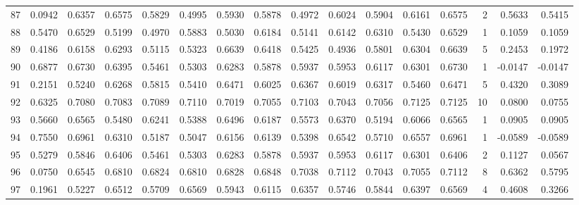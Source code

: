 \begin{tabular}{lrrrrrrrrrrrrrrr}
87  &      0.0942 &  0.6357 &  0.6575 &  0.5829 &  0.4995 &  0.5930 &  0.5878 &  0.4972 &  0.6024 &  0.5904 &   0.6161 &     0.6575 &      2 &                    0.5633 &                     0.5415 \\
88  &      0.5470 &  0.6529 &  0.5199 &  0.4970 &  0.5883 &  0.5030 &  0.6184 &  0.5141 &  0.6142 &  0.6310 &   0.5430 &     0.6529 &      1 &                    0.1059 &                     0.1059 \\
89  &      0.4186 &  0.6158 &  0.6293 &  0.5115 &  0.5323 &  0.6639 &  0.6418 &  0.5425 &  0.4936 &  0.5801 &   0.6304 &     0.6639 &      5 &                    0.2453 &                     0.1972 \\
90  &      0.6877 &  0.6730 &  0.6395 &  0.5461 &  0.5303 &  0.6283 &  0.5878 &  0.5937 &  0.5953 &  0.6117 &   0.6301 &     0.6730 &      1 &                   -0.0147 &                    -0.0147 \\
91  &      0.2151 &  0.5240 &  0.6268 &  0.5815 &  0.5410 &  0.6471 &  0.6025 &  0.6367 &  0.6019 &  0.6317 &   0.5460 &     0.6471 &      5 &                    0.4320 &                     0.3089 \\
92  &      0.6325 &  0.7080 &  0.7083 &  0.7089 &  0.7110 &  0.7019 &  0.7055 &  0.7103 &  0.7043 &  0.7056 &   0.7125 &     0.7125 &     10 &                    0.0800 &                     0.0755 \\
93  &      0.5660 &  0.6565 &  0.5480 &  0.6241 &  0.5388 &  0.6496 &  0.6187 &  0.5573 &  0.6370 &  0.5194 &   0.6066 &     0.6565 &      1 &                    0.0905 &                     0.0905 \\
94  &      0.7550 &  0.6961 &  0.6310 &  0.5187 &  0.5047 &  0.6156 &  0.6139 &  0.5398 &  0.6542 &  0.5710 &   0.6557 &     0.6961 &      1 &                   -0.0589 &                    -0.0589 \\
95  &      0.5279 &  0.5846 &  0.6406 &  0.5461 &  0.5303 &  0.6283 &  0.5878 &  0.5937 &  0.5953 &  0.6117 &   0.6301 &     0.6406 &      2 &                    0.1127 &                     0.0567 \\
96  &      0.0750 &  0.6545 &  0.6810 &  0.6824 &  0.6810 &  0.6828 &  0.6848 &  0.7038 &  0.7112 &  0.7043 &   0.7055 &     0.7112 &      8 &                    0.6362 &                     0.5795 \\
97  &      0.1961 &  0.5227 &  0.6512 &  0.5709 &  0.6569 &  0.5943 &  0.6115 &  0.6357 &  0.5746 &  0.5844 &   0.6397 &     0.6569 &      4 &                    0.4608 &                     0.3266 \\

\end{tabular}
